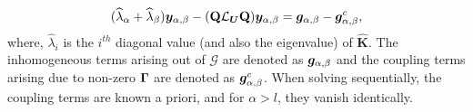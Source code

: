 \begin{align}
	\label{eqn:coupled_fields_app}
	(\widehat{\lambda}_{\alpha} + \widehat{\lambda}_{\beta})\boldsymbol{y}_{\alpha,\beta} 
	- (\mathbf{Q}\mathcal{L}_{\boldsymbol{U}}\mathbf{Q})\boldsymbol{y}_{\alpha,\beta} = \boldsymbol{g}_{\alpha,\beta} - \boldsymbol{g}^{c}_{\alpha,\beta},
\end{align}
where, $\widehat{\lambda}_{i}$ is the $i^{th}$ diagonal value (and also the eigenvalue) of $\mathbf{\widehat{K}}$. The inhomogeneous terms arising out of $\mathcal{G}$ are denoted as $\boldsymbol{g}_{\alpha,\beta}$ and the coupling terms arising due to non-zero $\mathbf{\Gamma}$ are denoted as $\boldsymbol{g}^{c}_{\alpha,\beta}$. When solving sequentially, the coupling terms are known a priori, and for $\alpha > l$, they vanish identically. 
 


%
